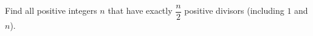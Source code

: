 Find all positive integers $n$ that have exactly $\dfrac {n}{2}$ positive divisors (including $1$ and $n$).
